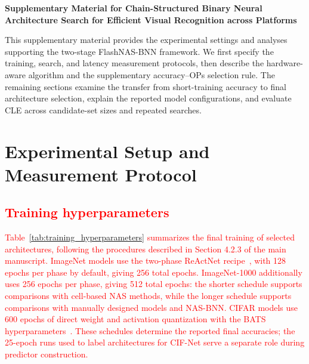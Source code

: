 \documentclass[preprint,review,12p,times]{elsarticle}
\begin{document}
\begin{center}
    {\Large\bfseries Supplementary Material for Chain-Structured Binary Neural Architecture Search for Efficient Visual Recognition across Platforms\par}
\end{center}
\vspace{1em}

This supplementary material provides the experimental settings and analyses supporting the two-stage FlashNAS-BNN framework. We first specify the training, search, and latency measurement protocols, then describe the hardware-aware algorithm and the supplementary accuracy--OPs selection rule. The remaining sections examine the transfer from short-training accuracy to final architecture selection, explain the reported model configurations, and evaluate CLE across candidate-set sizes and repeated searches.

\section{Experimental Setup and Measurement Protocol}
\label{sec:detailed_latency_benchmark}

\subsection{\textcolor{red}{Training hyperparameters}}
\label{sec:training_hyperparameters}

\textcolor{red}{Table~\ref{tab:training_hyperparameters} summarizes the final training of selected architectures, following the procedures described in Section 4.2.3 of the main manuscript. ImageNet models use the two-phase ReActNet recipe~\cite{Liu2020}, with 128 epochs per phase by default, giving 256 total epochs. ImageNet-1000 additionally uses 256 epochs per phase, giving 512 total epochs: the shorter schedule supports comparisons with cell-based NAS methods, while the longer schedule supports comparisons with manually designed models and NAS-BNN. CIFAR models use 600 epochs of direct weight and activation quantization with the BATS hyperparameters~\cite{Bulat2020}. These schedules determine the reported final accuracies; the 25-epoch runs used to label architectures for CIF-Net serve a separate role during predictor construction.}
\end{document}
